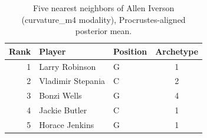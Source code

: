 \begin{table}[htbp]
  \centering\small
  \begin{tabular}{rllc}
    \toprule
    Rank & Player & Position & Archetype \\
    \midrule
    1 & Larry Robinson & G & 1 \\
    2 & Vladimir Stepania & C & 2 \\
    3 & Bonzi Wells & G & 4 \\
    4 & Jackie Butler & C & 1 \\
    5 & Horace Jenkins & G & 1 \\
    \bottomrule
  \end{tabular}
  \caption{Five nearest neighbors of Allen Iverson (curvature_m4 modality), Procrustes-aligned posterior mean.}
  \label{tab:Allen_Iverson_neighbors_curvature_m4}
\end{table}

